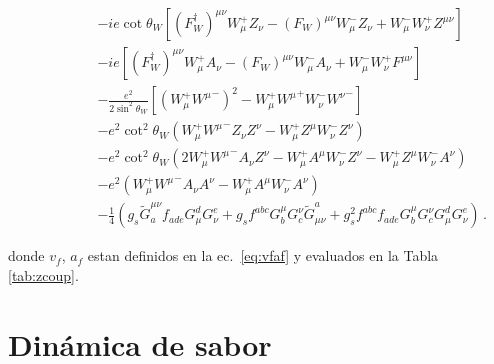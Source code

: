 \begin{frame}{}




\begin{align}
  \phantom{\mathcal{L}_{\text{1 gen}}=}
&-ie\cot\theta_W\left[(F_W^\dagger)^{\mu\nu}W_\mu^+ Z_\nu-(F_W)^{\mu\nu}W_\mu^- Z_\nu+W_\mu^-W_\nu^+Z^{\mu\nu}\right]\nonumber\\
&-ie\left[(F_W^\dagger)^{\mu\nu}W_\mu^+ A_\nu-(F_W)^{\mu\nu}W_\mu^- A_\nu+W_\mu^-W_\nu^+F^{\mu\nu}\right]\nonumber\\
&-\frac{e^2}{2\sin^2\theta_W}\left[\left(W_\mu^+{W^\mu}^-\right)^2-W_\mu^+{W^\mu}^+W_\nu^-{W^\nu}^-\right]\nonumber\\
&-e^2\cot^2\theta_W\left(W_\mu^+{W^\mu}^-Z_\nu Z^\nu-W_\mu^+Z^\mu W_\nu^-Z^\nu\right)\nonumber\\
&-e^2\cot^2\theta_W\left(2W_\mu^+{W^\mu}^-A_\nu Z^\nu-W_\mu^+A^\mu W_\nu^-Z^\nu-W_\mu^+Z^\mu W_\nu^-A^\nu\right)\nonumber\\
&-e^2\left(W_\mu^+{W^\mu}^-A_\nu A^\nu-W_\mu^+A^\mu W_\nu^-A^\nu\right)\nonumber\\
&- \frac{1}{4}\left(g_s\widetilde{G}^{\mu\nu}_af_{a d e}G^d_\mu G^e_\nu
    +g_sf^{a b c}G_b^\mu G_c^\nu\widetilde{G}_{\mu\nu}^a
    +g_s^2f^{a b c}f_{a d e}G_b^\mu G_c^\nu G^d_\mu G^e_\nu\right)\,.
\end{align}     
\end{frame}
\noindent
donde  $v_f$, $a_f$ estan definidos en la ec.~\eqref{eq:vfaf} y evaluados en la Tabla \ref{tab:zcoup}.
\section{Dinámica de sabor}
\label{sec:dinamica-de-sabor}


